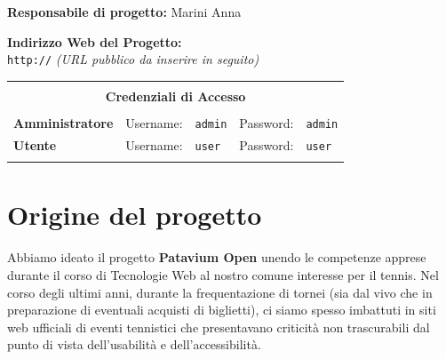 \documentclass[11pt,a4paper]{article}
\begin{document}
\begin{titlepage}
\begin{center}
        {\selectfont
            {\bfseries\color{brandblue} Responsabile di progetto:} Marini Anna}

        \vspace{1cm}
        
        {\selectfont
            {\bfseries\color{brandblue} Indirizzo Web del Progetto:}\\[0.2cm]
            \texttt{http://} \textit{(URL pubblico da inserire in seguito)}
        }
        
        \vspace{1cm}
        
        \noindent
        \begin{tabular}{|l r l r l|}
            \hline
            \multicolumn{5}{|c|}{} \\
            \multicolumn{5}{|c|}{\textbf{\color{brandblue} Credenziali di Accesso}} \\
            \multicolumn{5}{|c|}{} \\
            \textbf{Amministratore} & Username: & \texttt{admin} & Password: & \texttt{admin} \\
            \textbf{Utente} & Username: & \texttt{user} & Password: & \texttt{user} \\
            \multicolumn{5}{|c|}{} \\
            \hline
        \end{tabular}
        
        \vfill

    \end{center}
\end{titlepage}

\newpage
{}
\tableofcontents
\newpage
{}

\section{Origine del progetto}

Abbiamo ideato il progetto \textbf{Patavium Open} unendo le competenze apprese durante il corso di Tecnologie Web al nostro comune interesse per il tennis. Nel corso degli ultimi anni, durante la frequentazione di tornei (sia dal vivo che in preparazione di eventuali acquisti di biglietti), ci siamo spesso imbattuti in siti web ufficiali di eventi tennistici che presentavano criticità non trascurabili dal punto di vista dell'usabilità e dell'accessibilità.
\end{document}
